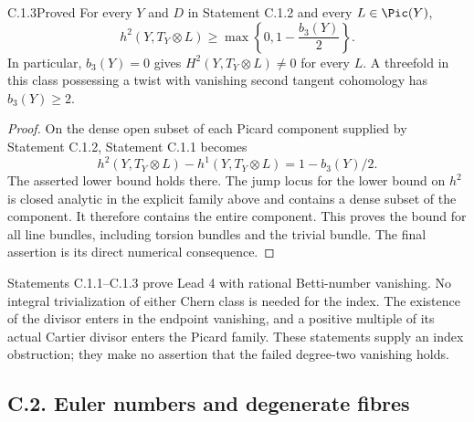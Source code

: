 \begin{idstatement}{C.1.3}{Proved}\label{st:C.1.3}
For every $Y$ and $D$ in Statement C.1.2 and every $L\in\Pic(Y)$,
\[
 h^2(Y,T_Y\otimes L)\geq
 \max\left\{0,1-\frac{b_3(Y)}2\right\}.
\]
In particular, $b_3(Y)=0$ gives $H^2(Y,T_Y\otimes L)\ne0$ for
every $L$. A threefold in this class possessing a twist with vanishing
second tangent cohomology has $b_3(Y)\geq2$.
\end{idstatement}
\begin{proof}
On the dense open subset of each Picard component supplied by
Statement C.1.2, Statement C.1.1 becomes
\[
 h^2(Y,T_Y\otimes L)-h^1(Y,T_Y\otimes L)
 =1-b_3(Y)/2.
\]
The asserted lower bound holds there. The jump locus for the lower
bound on $h^2$ is closed analytic in the explicit family above and
contains a dense subset of the component. It therefore contains the
entire component. This proves the bound for all line bundles,
including torsion bundles and the trivial bundle. The final assertion
is its direct numerical consequence.
\end{proof}

Statements C.1.1--C.1.3 prove Lead 4 with rational Betti-number
vanishing. No integral trivialization of either Chern class is needed
for the index. The existence of the divisor enters in the endpoint
vanishing, and a positive multiple of its actual Cartier divisor
enters the Picard family. These statements supply an index
obstruction; they make no assertion that the failed degree-two
vanishing holds.


\subsection{C.2. Euler numbers and degenerate fibres}


